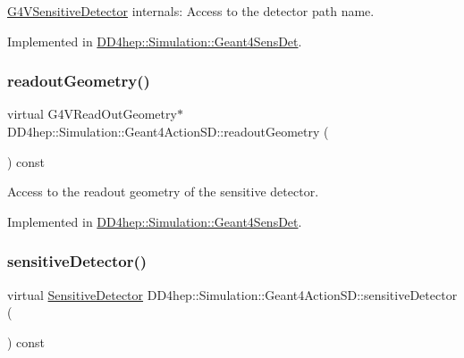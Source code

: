\hyperlink{class_g4_v_sensitive_detector}{G4\+V\+Sensitive\+Detector} internals\+: Access to the detector path name. 



Implemented in \hyperlink{class_d_d4hep_1_1_simulation_1_1_geant4_sens_det_af199492ba6d537d22ae3fcf5e6dddac3}{D\+D4hep\+::\+Simulation\+::\+Geant4\+Sens\+Det}.

\hypertarget{class_d_d4hep_1_1_simulation_1_1_geant4_action_s_d_abf432e0098d25759837ddc2af5dc6c16}{}\label{class_d_d4hep_1_1_simulation_1_1_geant4_action_s_d_abf432e0098d25759837ddc2af5dc6c16} 
\subsubsection{\texorpdfstring{readout\+Geometry()}{readoutGeometry()}}
{\footnotesize\ttfamily virtual G4\+V\+Read\+Out\+Geometry$\ast$ D\+D4hep\+::\+Simulation\+::\+Geant4\+Action\+S\+D\+::readout\+Geometry (\begin{DoxyParamCaption}{ }\end{DoxyParamCaption}) const\hspace{0.3cm}{\ttfamily [pure virtual]}}



Access to the readout geometry of the sensitive detector. 



Implemented in \hyperlink{class_d_d4hep_1_1_simulation_1_1_geant4_sens_det_a37cc84389484532daeb6fd0b28b53ca6}{D\+D4hep\+::\+Simulation\+::\+Geant4\+Sens\+Det}.

\hypertarget{class_d_d4hep_1_1_simulation_1_1_geant4_action_s_d_a8b1e15e8582895a6a7ad9ce4cf169e8e}{}\label{class_d_d4hep_1_1_simulation_1_1_geant4_action_s_d_a8b1e15e8582895a6a7ad9ce4cf169e8e} 
\subsubsection{\texorpdfstring{sensitive\+Detector()}{sensitiveDetector()}}
{\footnotesize\ttfamily virtual \hyperlink{class_d_d4hep_1_1_simulation_1_1_geant4_action_s_d_a8a292947ea3f9b419728ef729a7e3fae}{Sensitive\+Detector} D\+D4hep\+::\+Simulation\+::\+Geant4\+Action\+S\+D\+::sensitive\+Detector (\begin{DoxyParamCaption}{ }\end{DoxyParamCaption}) const\hspace{0.3cm}{\ttfamily [pure virtual]}}



